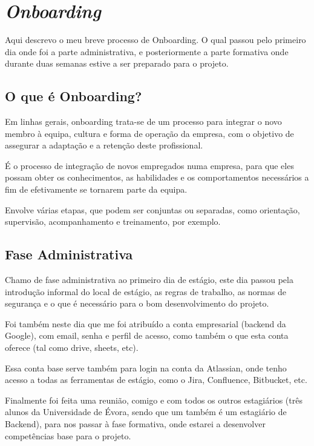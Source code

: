 \chapter{\textit{Onboarding}}
\label{cap3}

Aqui descrevo o meu breve processo de Onboarding. O qual passou pelo primeiro dia onde foi a parte administrativa, e posteriormente a parte formativa onde durante duas semanas estive a ser preparado para o projeto.

\section{O que é Onboarding?}

Em linhas gerais, onboarding trata-se de um processo para integrar o novo membro à equipa, cultura e forma de operação da empresa, com o objetivo de assegurar a adaptação e a retenção deste profissional.

É o processo de integração de novos empregados numa empresa, para que eles possam obter os conhecimentos, as habilidades e os comportamentos necessários a fim de efetivamente se tornarem parte da equipa.

Envolve várias etapas, que podem ser conjuntas ou separadas, como orientação, supervisão, acompanhamento e treinamento, por exemplo.

\section{Fase Administrativa}

Chamo de fase administrativa ao primeiro dia de estágio, este dia passou pela introdução informal do local de estágio, as regras de trabalho, as normas de segurança e o que é necessário para o bom desenvolvimento do projeto.

Foi também neste dia que me foi atribuído a conta empresarial (backend da Google), com email, senha e perfil de acesso, como também o que esta conta oferece (tal como drive, sheets, etc).

Essa conta base serve também para login na conta da Atlassian, onde tenho acesso a todas as ferramentas de estágio, como o Jira, Confluence, Bitbucket, etc.

Finalmente foi feita uma reunião, comigo e com todos os outros estagiários (três alunos da Universidade de Évora, sendo que um também é um estagiário de Backend), para nos passar à fase formativa, onde estarei a desenvolver competências base para o projeto.

